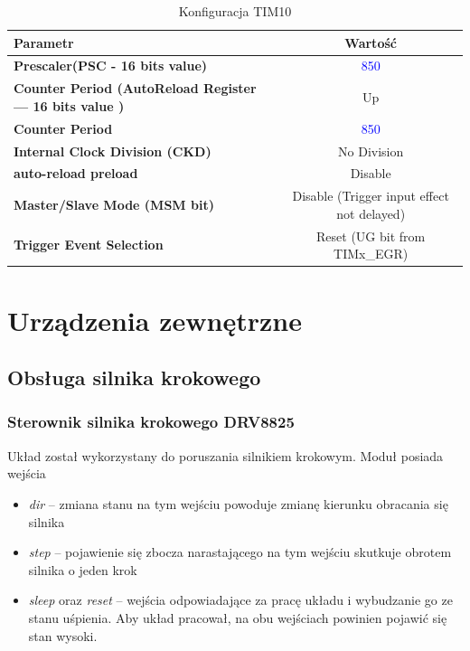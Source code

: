 \documentclass[10pt, a4paper]{article}
\begin{document}
\begin{table}[H]
    \centering
    \begin{tabular}{|l|c|} \hline
        \textbf{Parametr} & Wartość \\
        \hline
        \hline  \textbf{Prescaler(PSC - 16 bits value) }& \textcolor{blue}{850} \\
        \hline  \textbf{Counter Period (AutoReload Register --- 16 bits value )} & Up \\
        \hline  \textbf{Counter Period} & \textcolor{blue}{850} \\
        \hline  \textbf{Internal Clock Division (CKD) } & No Division\\
        \hline  \textbf{auto-reload preload} & Disable\\
        \hline  \textbf{Master/Slave Mode (MSM bit) } & Disable (Trigger input effect not delayed)
        \\
    \hline  \textbf{Trigger Event Selection} & Reset (UG bit from TIMx\_EGR)  \\
    \hline
 
    \end{tabular}
    \caption{Konfiguracja TIM10}
    \label{tab:TIM10}
\end{table}


\section{Urządzenia zewnętrzne}


\subsection{Obsługa silnika krokowego}
\subsubsection{Sterownik silnika krokowego DRV8825}
Układ został wykorzystany do poruszania silnikiem krokowym. Moduł posiada wejścia
\begin{itemize}
    \item \emph{dir} -- zmiana stanu na tym wejściu powoduje zmianę kierunku obracania się silnika
    \item \emph{step} -- pojawienie się zbocza narastającego na tym wejściu skutkuje obrotem silnika o jeden krok
    \item \emph{sleep} oraz \emph{reset} -- wejścia odpowiadające za pracę układu i wybudzanie go ze stanu uśpienia. Aby układ pracował, na obu wejściach powinien pojawić się stan wysoki.
\end{itemize}
\end{document}
